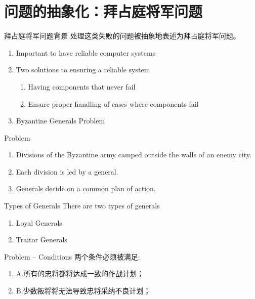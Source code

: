 \documentclass[11pt]{beamer}
\begin{document}
\section{问题的抽象化：拜占庭将军问题}

\begin{frame}{拜占庭将军问题背景}
	处理这类失败的问题被抽象地表述为拜占庭将军问题\cite{lamport_byzantine_1982}。
	\begin{enumerate}
\item Important to have reliable computer systems
\item  Two solutions to ensuring a reliable system
\begin{enumerate}
\item Having components that never fail
\item Ensure proper handling of cases where components fail
\end{enumerate}
\item Byzantine Generals Problem
	\end{enumerate}
\end{frame}

\begin{frame}{Problem}
\begin{enumerate}
	\item Divisions of the Byzantine army camped outside the walls of an enemy city.
\item  Each division is led by a general.
\item Generals decide on a common plan of action.
\end{enumerate}
\end{frame}

\begin{frame}{Types of Generals}
		There are two types of generals
	\begin{enumerate}
		\item Loyal Generals
		\item Traitor Generals
	\end{enumerate}
\end{frame}

\begin{frame}{Problem – Conditions}
两个条件必须被满足:
\begin{enumerate}
	\item A.所有的忠将都将达成一致的作战计划；
	\item B.少数叛将将无法导致忠将采纳不良计划； 
\end{enumerate}
	\end{frame}
\end{document}
